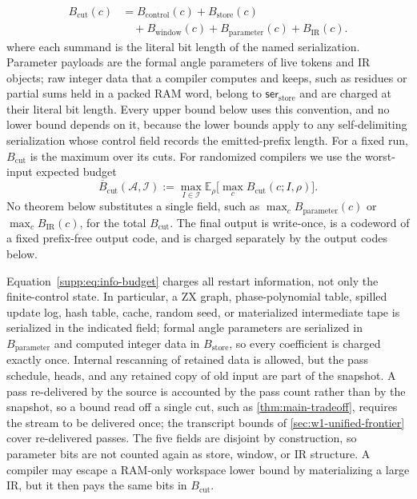 \begin{definition}
\begin{equation}
\boxed{
\begin{aligned}
B_{\mathrm{cut}}(c)
&=B_{\mathrm{control}}(c)+B_{\mathrm{store}}(c)\\
&\quad+B_{\mathrm{window}}(c)+B_{\mathrm{parameter}}(c)
      +B_{\mathrm{IR}}(c).
\end{aligned}}
\end{equation}
where each summand is the literal bit length of the named serialization.
Parameter payloads are the formal angle parameters of live tokens and IR
objects; raw integer data that a compiler computes and keeps, such as
residues or partial sums held in a packed RAM word, belong to
$\mathsf{ser}_{\mathrm{store}}$ and are charged at their literal bit
length.  Every upper bound below uses this convention, and no lower bound
depends on it, because the lower bounds apply to any self-delimiting
serialization whose control field records the emitted-prefix length.
For a fixed run, $B_{\mathrm{cut}}$ is the maximum over its cuts.  For
randomized compilers we use the worst-input expected budget
\begin{equation}
\label{eq:expected-cut}
 \overline B_{\mathrm{cut}}(\mathcal A,\mathcal I)
 :=\max_{I\in\mathcal I}\mathbb E_\rho
       \bigl[\max_c B_{\mathrm{cut}}(c;I,\rho)\bigr].
\end{equation}
No theorem below substitutes a single field, such as
$\max_cB_{\mathrm{parameter}}(c)$ or $\max_cB_{\mathrm{IR}}(c)$, for the
total $B_{\mathrm{cut}}$.  The final output is write-once, is a codeword of
a fixed prefix-free output code, and is charged separately by the output
codes below.
\end{definition}

\begin{remark}
\label{rem:escape-channels}
Equation~\eqref{supp:eq:info-budget} charges all restart information, not only
the finite-control state.  In particular, a ZX graph, phase-polynomial
table, spilled update log, hash table, cache, random seed, or materialized
intermediate tape is serialized in the indicated field; formal angle
parameters are serialized in $B_{\mathrm{parameter}}$ and computed integer
data in $B_{\mathrm{store}}$, so every coefficient is charged exactly
once.  Internal rescanning of retained data is allowed,
but the pass schedule, heads, and any retained copy of old input are part
of the snapshot.  A pass re-delivered by the source is accounted by the
pass count rather than by the snapshot, so a bound read off a single cut,
such as \cref{thm:main-tradeoff}, requires the stream to be delivered
once; the transcript bounds of \cref{sec:w1-unified-frontier} cover
re-delivered passes.  The five fields are disjoint by construction, so parameter bits
are not counted again as store, window, or IR structure.  A compiler may
escape a RAM-only workspace lower bound by materializing a large IR, but it
then pays the same bits in $B_{\mathrm{cut}}$.
\end{remark}

